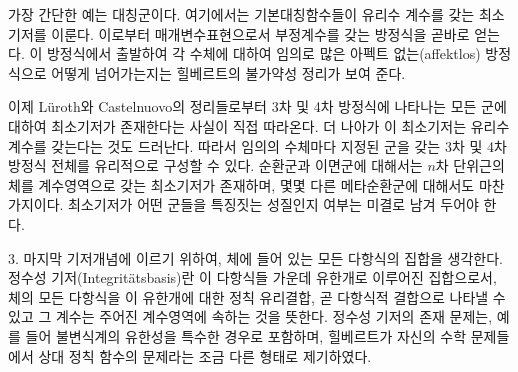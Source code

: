 
가장 간단한 예는 대칭군이다. 여기에서는 기본대칭함수들이 유리수 계수를 갖는 최소기저를 이룬다. 이로부터 매개변수표현으로서 부정계수를 갖는 방정식을 곧바로 얻는다. 이 방정식에서 출발하여 각 수체에 대하여 임의로 많은 아펙트 없는(affektlos) 방정식으로 어떻게 넘어가는지는 힐베르트의 불가약성 정리가 보여 준다.

이제 Lüroth와 Castelnuovo의 정리들로부터 3차 및 4차 방정식에 나타나는 모든 군에 대하여 최소기저가 존재한다는 사실이 직접 따라온다. 더 나아가 이 최소기저는 유리수 계수를 갖는다는 것도 드러난다. 따라서 임의의 수체마다 지정된 군을 갖는 3차 및 4차 방정식 전체를 유리적으로 구성할 수 있다. 순환군과 이면군에 대해서는 $n$차 단위근의 체를 계수영역으로 갖는 최소기저가 존재하며, 몇몇 다른 메타순환군에 대해서도 마찬가지이다. 최소기저가 어떤 군들을 특징짓는 성질인지 여부는 미결로 남겨 두어야 한다.

3. 마지막 기저개념에 이르기 위하여, 체에 들어 있는 모든 다항식의 집합을 생각한다. \glqq{}정수성 기저(Integritätsbasis)\grqq{}란 이 다항식들 가운데 유한개로 이루어진 집합으로서, 체의 모든 다항식을 이 유한개에 대한 정칙 유리결합, 곧 다항식적 결합으로 나타낼 수 있고 그 계수는 주어진 계수영역에 속하는 것을 뜻한다. 정수성 기저의 존재 문제는, 예를 들어 불변식계의 유한성을 특수한 경우로 포함하며, 힐베르트가 자신의 \glqq{}수학 문제들\grqq{}에서 상대 정칙 함수의 문제라는 조금 다른 형태로 제기하였다.
